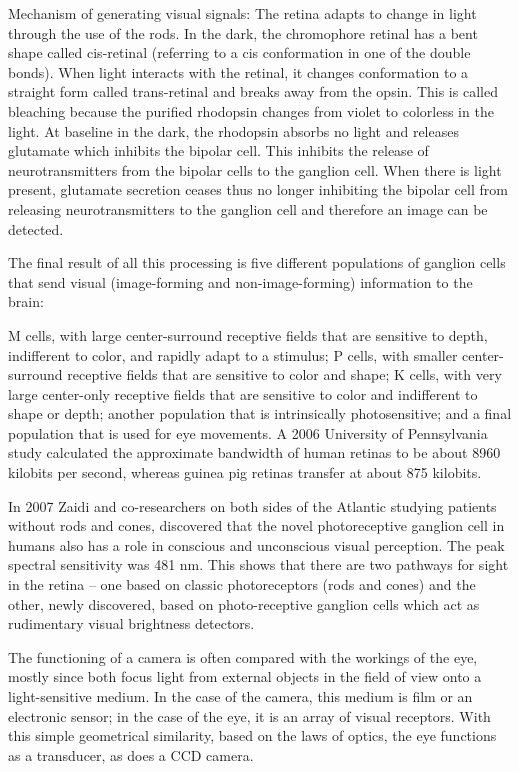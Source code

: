 Mechanism of generating visual signals: The retina adapts to change in light through the use of the rods. In the dark, the chromophore retinal has a bent shape called cis-retinal (referring to a cis conformation in one of the double bonds). When light interacts with the retinal, it changes conformation to a straight form called trans-retinal and breaks away from the opsin. This is called bleaching because the purified rhodopsin changes from violet to colorless in the light. At baseline in the dark, the rhodopsin absorbs no light and releases glutamate which inhibits the bipolar cell. This inhibits the release of neurotransmitters from the bipolar cells to the ganglion cell. When there is light present, glutamate secretion ceases thus no longer inhibiting the bipolar cell from releasing neurotransmitters to the ganglion cell and therefore an image can be detected.

The final result of all this processing is five different populations of ganglion cells that send visual (image-forming and non-image-forming) information to the brain:

M cells, with large center-surround receptive fields that are sensitive to depth, indifferent to color, and rapidly adapt to a stimulus;
P cells, with smaller center-surround receptive fields that are sensitive to color and shape;
K cells, with very large center-only receptive fields that are sensitive to color and indifferent to shape or depth;
another population that is intrinsically photosensitive; and
a final population that is used for eye movements.
A 2006 University of Pennsylvania study calculated the approximate bandwidth of human retinas to be about 8960 kilobits per second, whereas guinea pig retinas transfer at about 875 kilobits.

In 2007 Zaidi and co-researchers on both sides of the Atlantic studying patients without rods and cones, discovered that the novel photoreceptive ganglion cell in humans also has a role in conscious and unconscious visual perception. The peak spectral sensitivity was 481 nm. This shows that there are two pathways for sight in the retina -- one based on classic photoreceptors (rods and cones) and the other, newly discovered, based on photo-receptive ganglion cells which act as rudimentary visual brightness detectors.

The functioning of a camera is often compared with the workings of the eye, mostly since both focus light from external objects in the field of view onto a light-sensitive medium. In the case of the camera, this medium is film or an electronic sensor; in the case of the eye, it is an array of visual receptors. With this simple geometrical similarity, based on the laws of optics, the eye functions as a transducer, as does a CCD camera.

